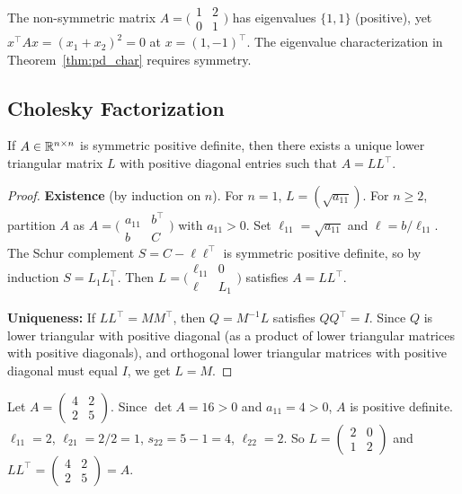 \documentclass[11pt,a4paper]{article}
\begin{document}
\begin{warning}[title={Positive Definiteness Requires Symmetry}]
The non-symmetric matrix $A = \bigl(\begin{smallmatrix} 1 & 2 \\ 0 & 1 \end{smallmatrix}\bigr)$
has eigenvalues $\{1,1\}$ (positive), yet
$x^\top Ax = (x_1 + x_2)^2 = 0$ at $x = (1,-1)^\top$.  The eigenvalue
characterization in Theorem~\ref{thm:pd_char} requires symmetry.
\end{warning}

\subsection{Cholesky Factorization}

\begin{theorem}
\label{thm:cholesky}
If $A \in \mathbb{R}^{n \times n}$ is symmetric positive definite, then there
exists a unique lower triangular matrix $L$ with positive diagonal entries
such that $A = LL^\top$.
\end{theorem}

\begin{proof}
\textbf{Existence} (by induction on $n$).  For $n = 1$, $L = (\sqrt{a_{11}})$.
For $n \geq 2$, partition $A$ as
$A = \bigl(\begin{smallmatrix} a_{11} & b^\top \\ b & C \end{smallmatrix}\bigr)$
with $a_{11} > 0$.  Set $\ell_{11} = \sqrt{a_{11}}$ and
$\ell = b/\ell_{11}$.  The Schur complement $S = C - \ell\ell^\top$ is
symmetric positive definite, so by induction $S = L_1 L_1^\top$.  Then
$L = \bigl(\begin{smallmatrix} \ell_{11} & 0 \\ \ell & L_1 \end{smallmatrix}\bigr)$
satisfies $A = LL^\top$.

\textbf{Uniqueness:} If $LL^\top = MM^\top$, then $Q = M^{-1}L$ satisfies
$QQ^\top = I$.  Since $Q$ is lower triangular with positive diagonal
(as a product of lower triangular matrices with positive diagonals), and
orthogonal lower triangular matrices with positive diagonal must equal $I$,
we get $L = M$.
\end{proof}

\begin{example}
\label{ex:cholesky}
Let $A = \begin{pmatrix} 4 & 2 \\ 2 & 5 \end{pmatrix}$.  Since
$\det A = 16 > 0$ and $a_{11} = 4 > 0$, $A$ is positive definite.
$\ell_{11} = 2$, $\ell_{21} = 2/2 = 1$, $s_{22} = 5 - 1 = 4$,
$\ell_{22} = 2$.  So
$L = \begin{pmatrix} 2 & 0 \\ 1 & 2 \end{pmatrix}$ and
$LL^\top = \begin{pmatrix} 4 & 2 \\ 2 & 5 \end{pmatrix} = A$.
\end{example}
\end{document}
